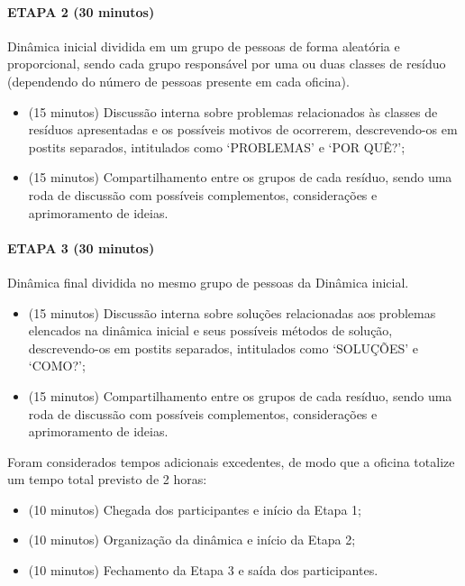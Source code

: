 \paragraph{ETAPA 2 (30 minutos)} Dinâmica inicial dividida em um grupo de pessoas de forma aleatória e proporcional, sendo cada grupo responsável por uma ou duas classes de resíduo (dependendo do número de pessoas presente em cada oficina).
\begin{itemize}
	\item (15 minutos) Discussão interna sobre problemas relacionados às classes de resíduos apresentadas e os possíveis motivos de ocorrerem, descrevendo-os em postits separados, intitulados como ‘PROBLEMAS’ e ‘POR QUÊ?’;
	\item (15 minutos) Compartilhamento entre os grupos de cada resíduo, sendo uma roda de discussão com possíveis complementos, considerações e aprimoramento de ideias.
\end{itemize}

\paragraph{ETAPA 3 (30 minutos)} Dinâmica final dividida no mesmo grupo de pessoas da Dinâmica inicial.

\begin{itemize}
	\item (15 minutos) Discussão interna sobre soluções relacionadas aos problemas elencados na dinâmica inicial e seus possíveis métodos de solução, descrevendo-os em postits separados, intitulados como ‘SOLUÇÕES’ e ‘COMO?’;
	\item (15 minutos) Compartilhamento entre os grupos de cada resíduo, sendo uma roda de discussão com possíveis complementos, considerações e aprimoramento de ideias.
\end{itemize}

Foram considerados tempos adicionais excedentes, de modo que a oficina totalize um tempo total previsto de 2 horas:
\begin{itemize}
	\item (10 minutos) Chegada dos participantes e início da Etapa 1;
	\item (10 minutos) Organização da dinâmica e início da Etapa 2;
	\item (10 minutos) Fechamento da Etapa 3 e saída dos participantes.
\end{itemize}



